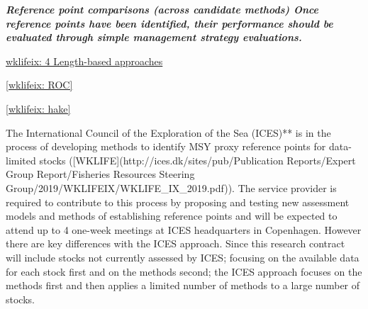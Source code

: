 \textit{\textbf{Reference point comparisons (across candidate methods) Once reference points have been identified, their performance should be evaluated through simple management strategy evaluations.}}


\href{http://ices.dk/sites/pub/Publication Reports/Expert Group Report/Fisheries Resources Steering Group/2019/WKLIFEIX/WKLIFE_IX_2019.pdf#page=30}{wklifeix: 4 Length-based approaches}

\href{http://ices.dk/sites/pub/Publication Reports/Expert Group Report/Fisheries Resources Steering Group/2019/WKLIFEIX/WKLIFE_IX_2019.pdf#page=58}{[wklifeix: ROC]}

\href{http://ices.dk/sites/pub/Publication Reports/Expert Group Report/Fisheries Resources Steering Group/2019/WKLIFEIX/WKLIFE_IX_2019.pdf#page=100}{[wklifeix: hake]}

The International Council of the Exploration of the Sea (ICES)** is in the process of developing methods to identify MSY proxy reference points for data-limited stocks ([WKLIFE](http://ices.dk/sites/pub/Publication Reports/Expert Group Report/Fisheries Resources Steering Group/2019/WKLIFEIX/WKLIFE_IX_2019.pdf)). The service provider is required to contribute to this process by proposing and testing new assessment models and methods of establishing reference points and will be expected to attend up to 4 one-week meetings at ICES headquarters in Copenhagen. However there are key differences with the ICES approach. Since this research contract will include stocks not currently assessed by ICES; focusing on the available data for each stock first and on the methods second; the ICES approach focuses on the methods first and then applies a limited number of methods to a large number of stocks.


